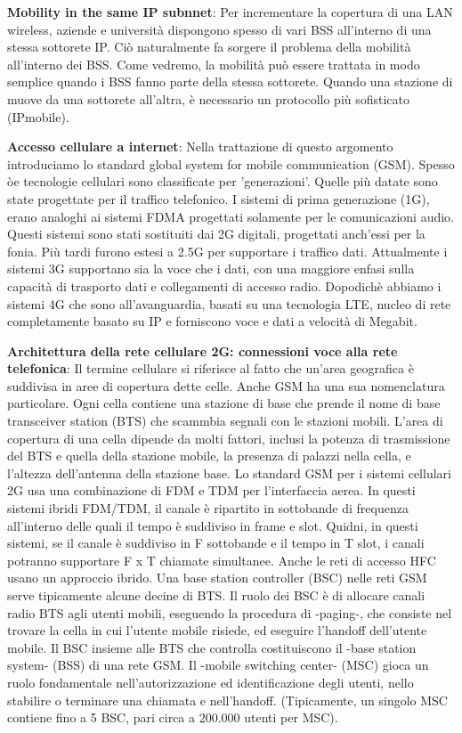 \documentclass[a4paper,10pt]{article} %
\renewcommand{\b}[1]{%
    {\textbf{#1}}}
\begin{document}
\b{Mobility in the same IP subnnet}: Per incrementare la copertura di una LAN wireless, aziende e università dispongono spesso di vari BSS all'interno di una stessa sottorete IP. Ciò naturalmente  fa sorgere il problema della mobilità all'interno dei BSS. Come vedremo, la mobilità può essere trattata  in modo semplice quando i BSS fanno parte della stessa sottorete. Quando una stazione di muove da una sottorete all'altra, è necessario un protocollo più sofisticato (IPmobile).

\b{Accesso cellulare a internet}: Nella trattazione di questo argomento introduciamo lo standard global system for mobile communication (GSM). Spesso òe tecnologie cellulari sono classificate per 'generazioni'. Quelle più datate sono state progettate per il traffico telefonico. I sistemi di prima generazione (1G), erano analoghi ai sistemi FDMA progettati solamente per le comunicazioni audio. Questi sistemi sono stati sostituiti dai 2G digitali, progettati anch'essi per la fonia. Più tardi furono estesi a 2.5G per supportare i traffico dati. Attualmente i sistemi 3G supportano sia la voce che i dati, con una maggiore enfasi sulla capacità di trasporto dati e collegamenti di accesso radio. Dopodichè abbiamo i sistemi 4G che sono all'avanguardia, basati su una tecnologia LTE, nucleo di rete completamente basato su IP e forniscono voce e dati a velocità di Megabit.

\b{Architettura della rete cellulare 2G: connessioni voce alla rete telefonica}: Il termine cellulare si riferisce al fatto che un'area geografica è suddivisa in aree di copertura dette celle. Anche GSM ha una sua nomenclatura particolare. Ogni cella contiene una stazione di base che prende il nome di base transceiver station (BTS) che scammbia segnali con le stazioni mobili. L'area di copertura di una cella dipende da molti fattori, inclusi la potenza di trasmissione del BTS e quella della stazione mobile, la presenza di palazzi nella cella, e l'altezza dell'antenna della stazione base.
Lo standard GSM per i sistemi cellulari 2G usa una combinazione di FDM e TDM per l'interfaccia aerea. In questi sistemi ibridi FDM/TDM, il canale è ripartito in sottobande di frequenza all'interno delle quali il tempo è suddiviso in frame e slot. Quidni, in questi sistemi, se il canale è suddiviso in F sottobande e il tempo in T slot, i canali potranno supportare F x T chiamate simultanee. Anche le reti di accesso HFC usano un approccio ibrido. Una base station controller (BSC) nelle reti GSM serve tipicamente alcune decine di BTS. Il ruolo dei BSC è di allocare canali radio BTS agli utenti mobili, eseguendo la procedura di -paging-, che consiste nel trovare la cella in cui l'utente mobile risiede, ed eseguire l'handoff dell'utente mobile. Il BSC insieme alle BTS che controlla costituiscono il -base station system- (BSS) di una rete GSM. Il -mobile switching center- (MSC) gioca un ruolo fondamentale nell'autorizzazione ed identificazione degli utenti, nello stabilire o terminare una chiamata e nell'handoff. (Tipicamente, un singolo MSC contiene fino a 5 BSC, pari circa a 200.000 utenti per MSC).
\end{document}

